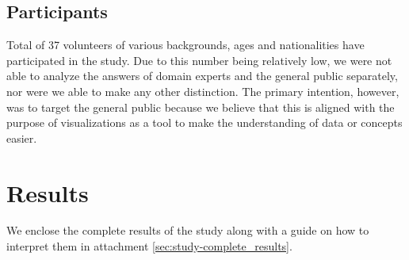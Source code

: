 \subsection{Participants}

Total of 37 volunteers of various backgrounds, ages and nationalities have participated in the study. Due to this number being relatively low, we were not able to analyze the answers of domain experts and the general public separately, nor were we able to make any other distinction. The primary intention, however, was to target the general public because we believe that this is aligned with the purpose of visualizations as a tool to make the understanding of data or concepts easier.

\section{Results}

We enclose the complete results of the study along with a guide on how to interpret them in attachment \ref{sec:study-complete_results}.